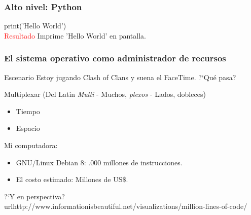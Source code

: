 \begin{frame}
\frametitle{Alto nivel: Python}
    print('Hello World') \\
\pause
\textcolor{red}{Resultado} \pause Imprime 'Hello World' en pantalla.
\end{frame}

\begin{frame}
    \frametitle{El sistema operativo como administrador de recursos}
    \begin{block}{Escenario}
        Estoy jugando Clash of Clans y suena el FaceTime. ?`Qu\'e pasa?
    \end{block}
    \pause
    Multiplexar (Del Latin \emph{Multi} - Muchos, \emph{plexos} - Lados, dobleces)
    \begin{itemize}
        \item Tiempo \pause
        \item Espacio
    \end{itemize}
\end{frame}

\begin{frame}
    Mi computadora:
    \begin{itemize}
        \item GNU/Linux Debian 8: .000 millones de instrucciones.
        \item El costo estimado:  Millones de US\$.  
    \end{itemize}
    ?`Y en perspectiva?
        url{http://www.informationisbeautiful.net/visualizations/million-lines-of-code/}
\end{frame}

